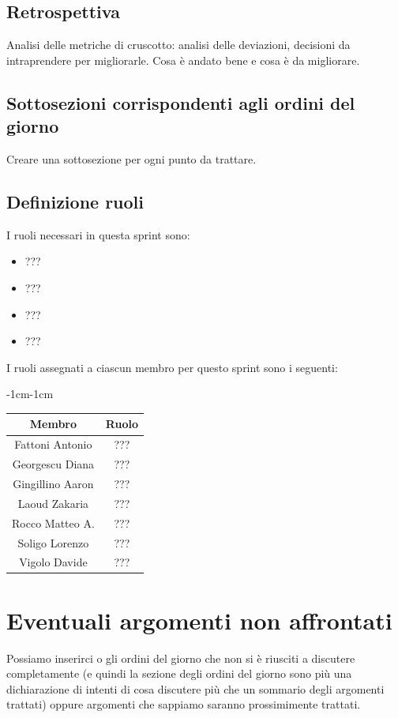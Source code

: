 \documentclass[a4paper,12pt]{article}
\begin{document}
\subsection{Retrospettiva}
Analisi delle metriche di cruscotto: analisi delle deviazioni, decisioni da intraprendere per migliorarle. Cosa è andato bene e cosa è da migliorare.

\subsection{Sottosezioni corrispondenti agli ordini del giorno}
Creare una sottosezione per ogni punto da trattare.

\subsection{Definizione ruoli}
I ruoli necessari in questa sprint sono:
\begin{itemize}[noitemsep]
    \item ???
    \item ???
    \item ???
    \item ???
\end{itemize}

I ruoli assegnati a ciascun membro per questo sprint sono i seguenti:
\begin{table}[H]
    \begin{adjustwidth}{-1cm}{-1cm}
    \centering
\begin{tabular}{|c|c|}
    \hline
    \textbf{Membro} & \textbf{Ruolo} \\
    \hline
    Fattoni Antonio & ??? \\
    \hline
    Georgescu Diana & ??? \\
    \hline
    Gingillino Aaron & ??? \\
    \hline
    Laoud Zakaria & ??? \\
    \hline
    Rocco Matteo A. & ??? \\
    \hline
    Soligo Lorenzo & ??? \\
    \hline
    Vigolo Davide & ??? \\
    \hline
\end{tabular}
    \end{adjustwidth}
\end{table}

\section{Eventuali argomenti non affrontati}
Possiamo inserirci o gli ordini del giorno che non si è riusciti a discutere completamente (e quindi la sezione degli ordini del giorno sono più una dichiarazione di intenti di cosa discutere più che un sommario degli argomenti trattati) oppure argomenti che sappiamo saranno prossimimente trattati.
\end{document}
